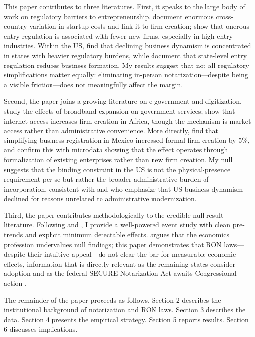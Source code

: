 \documentclass[12pt]{article}
\begin{document}
This paper contributes to three literatures. First, it speaks to the large body of work on regulatory barriers to entrepreneurship. \citet{djankov2002regulation} document enormous cross-country variation in startup costs and link it to firm creation; \citet{klapper2006entry} show that onerous entry regulation is associated with fewer new firms, especially in high-entry industries. Within the US, \citet{goldschlag2017} find that declining business dynamism is concentrated in states with heavier regulatory burdens, while \citet{bailey2019regulation} document that state-level entry regulation reduces business formation. My results suggest that not all regulatory simplifications matter equally: eliminating in-person notarization---despite being a visible friction---does not meaningfully affect the margin.

Second, the paper joins a growing literature on e-government and digitization. \citet{falvey2022} study the effects of broadband expansion on government services; \citet{hjort2019} show that internet access increases firm creation in Africa, though the mechanism is market access rather than administrative convenience. More directly, \citet{bruhn2011} find that simplifying business registration in Mexico increased formal firm creation by 5\%, and \citet{kaplan2011} confirm this with microdata showing that the effect operates through formalization of existing enterprises rather than new firm creation. My null suggests that the binding constraint in the US is not the physical-presence requirement per se but rather the broader administrative burden of incorporation, consistent with \citet{haltiwanger2013} and \citet{decker2014} who emphasize that US business dynamism declined for reasons unrelated to administrative modernization.

Third, the paper contributes methodologically to the credible null result literature. Following \citet{rambachan2023more} and \citet{callaway2021difference}, I provide a well-powered event study with clean pre-trends and explicit minimum detectable effects. \citet{abadie2020} argues that the economics profession undervalues null findings; this paper demonstrates that RON laws---despite their intuitive appeal---do not clear the bar for measurable economic effects, information that is directly relevant as the remaining states consider adoption and as the federal SECURE Notarization Act awaits Congressional action \citep{congress2023secure}.

The remainder of the paper proceeds as follows. Section 2 describes the institutional background of notarization and RON laws. Section 3 describes the data. Section 4 presents the empirical strategy. Section 5 reports results. Section 6 discusses implications.
\end{document}
